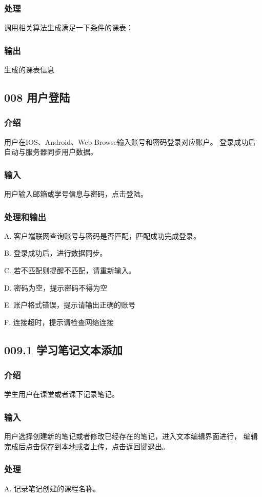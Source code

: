     \subsubsection{处理}
    调用相关算法生成满足一下条件的课表：
    \subsubsection{输出}
    生成的课表信息

 \subsection{008 用户登陆}
    \subsubsection{介绍}
	用户在IOS、Android、Web Browse输入账号和密码登录对应账户。
登录成功后自动与服务器同步用户数据。
    \subsubsection{输入}
    用户输入邮箱或学号信息与密码，点击登陆。
    \subsubsection{处理和输出}
    A. 客户端联网查询账号与密码是否匹配，匹配成功完成登录。

    B. 登录成功后，进行数据同步。

    C. 若不匹配则提醒不匹配，请重新输入。

    D. 密码为空，提示密码不得为空

    E. 账户格式错误，提示请输出正确的账号

    F. 连接超时，提示请检查网络连接
 \subsection{009.1 学习笔记文本添加}
    \subsubsection{介绍}
	学生用户在课堂或者课下记录笔记。
    \subsubsection{输入}
	用户选择创建新的笔记或者修改已经存在的笔记，进入文本编辑界面进行，
编辑完成后点击保存到本地或者上传，点击返回键退出。
    \subsubsection{处理}
	A. 记录笔记创建的课程名称。

